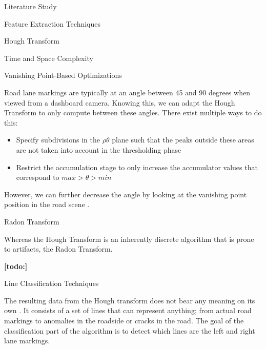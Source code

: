 \documentclass{matthijs}
\begin{document}
\begin{hoofdstuk}{Literature Study}
\begin{paragraaf}{Feature Extraction Techniques}
\begin{subparagraaf}{Hough Transform}
\begin{subsubparagraaf}{Time and Space Complexity}
				\end{subsubparagraaf}

				\begin{subsubparagraaf}{Vanishing Point-Based Optimizations}

					Road lane markings are typically at an angle between 45 and 90 degrees when viewed from a dashboard camera.
					Knowing this, we can adapt the Hough Transform to only compute between these angles.
					There exist multiple ways to do this:

					\begin{itemize}

						\item Specify subdivisions in the $\rho\theta$ plane such that the peaks outside these areas are not taken into account in the thresholding phase \cite{solberg2009hough}
						\item Restrict the accumulation stage to only increase the accumulator values that correspond to $ max > \theta > min $ \cite{looges1993hough}
					\end{itemize}

					However, we can further decrease the angle by looking at the vanishing point position in the road scene \cite{shang2011lane}.

				\end{subsubparagraaf}

			\end{subparagraaf}

			\begin{subparagraaf}{Radon Transform}

				Whereas the Hough Transform is an inherently discrete algorithm that is prone to artifacts, the Radon Transform.

				\textbf{[todo:]}

			\end{subparagraaf}

		\end{paragraaf}

		\begin{paragraaf}{Line Classification Techniques}

			The resulting data from the Hough transform does not bear any meaning on its own \cite{gupta2016automated}.
			It consists of a set of lines that can represent anything; from actual road markings to anomalies in the roadside or cracks in the road.
			The goal of the classification part of the algorithm is to detect which lines are the left and right lane markings.


\end{paragraaf}
\end{hoofdstuk}
\end{document}

